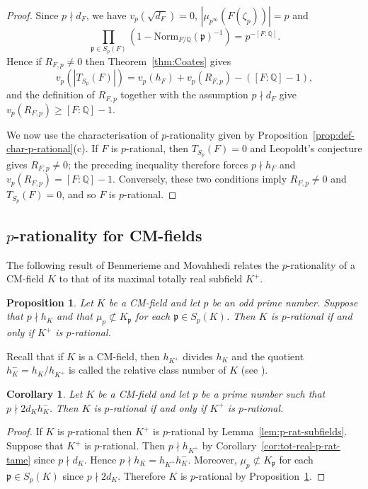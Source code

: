 \documentclass[12pt, a4paper, usenames]{amsart}
\newcommand{\Q}{\mathbb{Q}}
\theoremstyle{plain}
\newtheorem{corollary}[theorem]{Corollary}
\newtheorem{prop}[theorem]{Proposition}
\theoremstyle{remark}
\theoremstyle{definition}
\newcommand{\Norm}{\mathrm{Norm}}
\begin{document}
\begin{proof}
Since $p \nmid d_{F}$, we have 
$v_{p}(\sqrt{d_{F}})=0$, $|\mu_{p^{\infty}}(F(\zeta_{p}))|=p$
and
\[
\textstyle{\prod_{\mathfrak{p} \in S_{p}(F)} \left( 1 - \Norm_{F/\Q}(\mathfrak{p})^{-1} \right)} = p^{-[F:\Q]}.
\]
Hence if $R_{F,p}\ne0$ then Theorem~\ref{thm:Coates} gives
\[
v_{p}(|T_{S_p}(F)|)
=
v_{p}(h_{F}) + v_{p}(R_{F,p})-([F:\Q]-1),
\]
and the definition of $R_{F,p}$ together with 
the assumption $p\nmid d_{F}$ give $v_{p}(R_{F,p})\geq [F:\Q]-1$.

We now use the characterisation of $p$-rationality given by 
Proposition~\ref{prop:def-char-p-rational}(c).
If $F$ is $p$-rational, then $T_{S_p}(F)=0$ and Leopoldt’s conjecture gives $R_{F,p}\ne0$; 
the preceding inequality therefore forces $p \nmid h_{F}$ and 
$v_{p}(R_{F,p})=[F:\Q]-1$. Conversely, these two conditions imply $R_{F,p}\ne0$ 
and $T_{S_p}(F)=0$, and so $F$ is $p$-rational.
\end{proof}

\subsection{$p$-rationality for CM-fields}
The following result of Benmerieme and Movahhedi \cite[Proposition~2.14]{MR4192837}
relates the $p$-rationality of a CM-field $K$ to that of its maximal totally real 
subfield $K^{+}$.

\begin{prop}\label{prop:CM-tot-real-p-rat}
Let $K$ be a CM-field and let $p$ be an odd prime number. 
Suppose that $p \nmid h_{K}$ and that 
$\mu_{p} \not \subset K_{\mathfrak{p}}$ for each $\mathfrak{p} \in S_{p}(K)$.
Then $K$ is $p$-rational if and only if $K^{+}$ is $p$-rational.
\end{prop}

Recall that if $K$ is a CM-field, then $h_{K^{+}}$ divides $h_{K}$ and the 
quotient $h_{K}^{-} = h_{K} / h_{K^{+}}$ is called the relative class number of $K$
(see \cite[Theorem~4.10]{MR1421575}).

\begin{corollary}\label{cor:CM-tot-real-p-rat}
Let $K$ be a CM-field and let $p$ be a prime number such that $p \nmid 2d_{K}h_{K}^{-}$.
Then $K$ is $p$-rational if and only if $K^{+}$ is $p$-rational.
\end{corollary}

\begin{proof}
If $K$ is $p$-rational then $K^{+}$ is $p$-rational by Lemma~\ref{lem:p-rat-subfields}.
Suppose that $K^{+}$ is $p$-rational.
Then $p \nmid h_{K^{+}}$ by Corollary~\ref{cor:tot-real-p-rat-tame} since 
$p \nmid d_{K}$. Hence $p \nmid h_{K} =  h_{K^{+}} h_{K}^{-}$.
Moreover, $\mu_{p} \not \subset K_{\mathfrak{p}}$ 
for each $\mathfrak{p} \in S_{p}(K)$ since $p \nmid 2d_{K}$.
Therefore $K$ is $p$-rational by Proposition~\ref{prop:CM-tot-real-p-rat}.
\end{proof}
\end{document}
